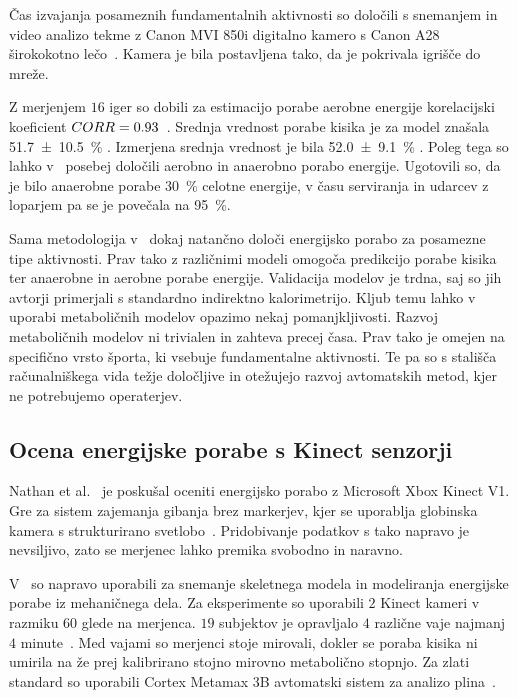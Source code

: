 Čas izvajanja posameznih fundamentalnih aktivnosti so določili s snemanjem in video analizo tekme z Canon MVI 850i digitalno kamero s Canon A28 širokokotno lečo~\cite{botton2011energy}. Kamera je bila postavljena %
tako, da je pokrivala igrišče do mreže. 

Z merjenjem $16$ iger so dobili za estimacijo porabe aerobne energije korelacijski koeficient ${CORR} = 0.93$~\cite{botton2011energy}. Srednja vrednost porabe kisika je za model znašala \SI{51.7 \pm 10.5}{\%} \vomax. Izmerjena srednja vrednost je bila \SI{52.0 \pm 9.1}{\%} \vomax. Poleg tega so lahko 
v~\cite{botton2011energy} posebej določili aerobno in anaerobno porabo energije. Ugotovili so, da je bilo anaerobne porabe \SI{30}{\%} celotne energije, v času serviranja in udarcev z loparjem pa se je povečala na \SI{95}{\%}.  

Sama metodologija v~\cite{botton2011energy} dokaj natančno določi energijsko porabo za posamezne tipe aktivnosti. Prav tako z različnimi modeli omogoča predikcijo porabe kisika ter anaerobne in aerobne porabe energije. Validacija modelov je trdna, saj so jih avtorji primerjali s standardno indirektno kalorimetrijo. Kljub temu lahko v uporabi metaboličnih modelov opazimo nekaj pomanjkljivosti. Razvoj metaboličnih modelov ni trivialen in zahteva precej časa. Prav tako je omejen na specifično vrsto športa, ki vsebuje fundamentalne aktivnosti. Te pa so s stališča računalniškega vida težje določljive in otežujejo razvoj avtomatskih metod, kjer ne potrebujemo operaterjev.




\subsection{Ocena energijske porabe s Kinect senzorji}

Nathan et al.~\cite{nathan2015estimating} je poskušal oceniti energijsko porabo z Microsoft Xbox Kinect V1. Gre za sistem zajemanja gibanja brez markerjev, kjer se uporablja globinska kamera s strukturirano svetlobo~\cite{nathan2015estimating}. Pridobivanje podatkov s tako napravo je nevsiljivo, zato se merjenec lahko premika svobodno in naravno. 

V~\cite{nathan2015estimating} so napravo uporabili za snemanje skeletnega modela in modeliranja energijske porabe iz mehaničnega dela. Za eksperimente so uporabili $2$ Kinect kameri v razmiku \SI{60}{\stopinj} glede na merjenca. $19$ subjektov je opravljalo $4$ različne vaje najmanj $4$ minute~\cite{nathan2015estimating}. Med vajami so merjenci stoje mirovali, dokler se poraba kisika ni umirila na že prej kalibrirano stojno mirovno metabolično stopnjo. Za zlati standard so uporabili Cortex Metamax 3B avtomatski sistem za analizo plina~\cite{nathan2015estimating}.


